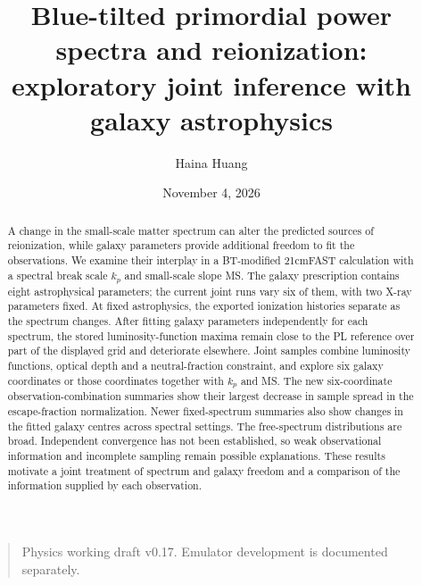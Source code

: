 \documentclass[reprint,superscriptaddress,nofootinbib,nobibnotes,amsmath,amssymb,aps,prd,floatfix,longbibliography]{revtex4-2}
\def\btemubody{paper/sections/btemu_body.tex}%
\def\btemubody{sections/btemu_body.tex}%
\begin{document}
\title{Blue-tilted primordial power spectra and reionization: exploratory joint inference with galaxy astrophysics}
\author{Haina Huang}
\date{November 4, 2026}
\begin{abstract}
A change in the small-scale matter spectrum can alter the predicted sources of reionization, while galaxy parameters provide additional freedom to fit the observations. We examine their interplay in a BT-modified 21cmFAST calculation with a spectral break scale $k_p$ and small-scale slope MS. The galaxy prescription contains eight astrophysical parameters; the current joint runs vary six of them, with two X-ray parameters fixed. At fixed astrophysics, the exported ionization histories separate as the spectrum changes. After fitting galaxy parameters independently for each spectrum, the stored luminosity-function maxima remain close to the PL reference over part of the displayed grid and deteriorate elsewhere. Joint samples combine luminosity functions, optical depth and a neutral-fraction constraint, and explore six galaxy coordinates or those coordinates together with $k_p$ and MS. The new six-coordinate observation-combination summaries show their largest decrease in sample spread in the escape-fraction normalization. Newer fixed-spectrum summaries also show changes in the fitted galaxy centres across spectral settings. The free-spectrum distributions are broad. Independent convergence has not been established, so weak observational information and incomplete sampling remain possible explanations. These results motivate a joint treatment of spectrum and galaxy freedom and a comparison of the information supplied by each observation.
\end{abstract}
\maketitle
\begin{quote}\small Physics working draft v0.17. Emulator development is documented separately.\end{quote}

\end{document}
